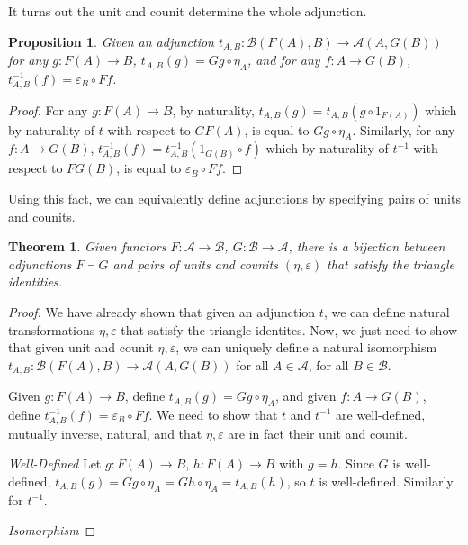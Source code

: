 \documentclass[11pt]{article}
\theoremstyle{definition}
\theoremstyle{definition}
\theoremstyle{plain}
\newtheorem{theo}{Theorem}
\theoremstyle{plain}
\newtheorem{prop}{Proposition}
\theoremstyle{plain}
\begin{document}
It turns out the unit and counit determine the whole adjunction.

\begin{prop}
Given an adjunction $t_{A,B}:\mathscr{B}(F(A),B) \to \mathscr{A}(A,G(B))$ for any $g:F(A) \to B$, $t_{A,B}(g)=Gg \circ \eta_{A}$, and for any $f:A \to G(B)$, $t^{-1}_{A,B}(f)=\varepsilon_{B} \circ Ff$.
\end{prop}

\begin{proof}
For any $g:F(A) \to B$, by naturality, $t_{A,B}(g)=t_{A,B}(g \circ 1_{F(A)})$ which by naturality of $t$ with respect to $GF(A)$, is equal to $Gg \circ \eta_{A}$. Similarly, for any $f:A \to G(B)$, $t^{-1}_{A,B}(f) = t^{-1}_{A,B}(1_{G(B)} \circ f)$ which by naturality of $t^{-1}$ with respect to $FG(B)$, is equal to $\varepsilon_{B} \circ Ff$.
\end{proof}

Using this fact, we can equivalently define adjunctions by specifying pairs of units and counits.

\begin{theo}
Given functors $F:\mathscr{A} \to \mathscr{B}$, $G: \mathscr{B} \to \mathscr{A}$, there is a bijection between adjunctions $F \dashv G$ and pairs of units and counits $(\eta, \varepsilon)$ that satisfy the triangle identities.
\end{theo}

\begin{proof}
We have already shown that given an adjunction $t$, we can define natural transformations $\eta, \varepsilon$ that satisfy the triangle identites. Now, we just need to show that given unit and counit $\eta, \varepsilon$, we can uniquely define a natural isomorphism $t_{A,B}:\mathscr{B}(F(A),B) \to \mathscr{A}(A,G(B))$ for all $A \in \mathscr{A}$, for all $B \in \mathscr{B}$.

Given $g:F(A) \to B$, define $t_{A,B}(g)=Gg \circ \eta_{A}$, and given $f: A \to G(B)$, define $t^{-1}_{A,B}(f)=\varepsilon_{B} \circ Ff$. We need to show that $t$ and $t^{-1}$ are well-defined, mutually inverse, natural, and that $\eta, \varepsilon$ are in fact their unit and counit.

\emph{Well-Defined}
Let $g:F(A) \to B$, $h: F(A) \to B$ with $g = h$. Since $G$ is well-defined, $t_{A,B}(g)=Gg \circ \eta_{A} = Gh \circ \eta_{A} = t_{A,B}(h)$, so $t$ is well-defined. Similarly for $t^{-1}$.

\emph{Isomorphism}

\end{proof}

 \nocite{*}
 
 
\end{document}
